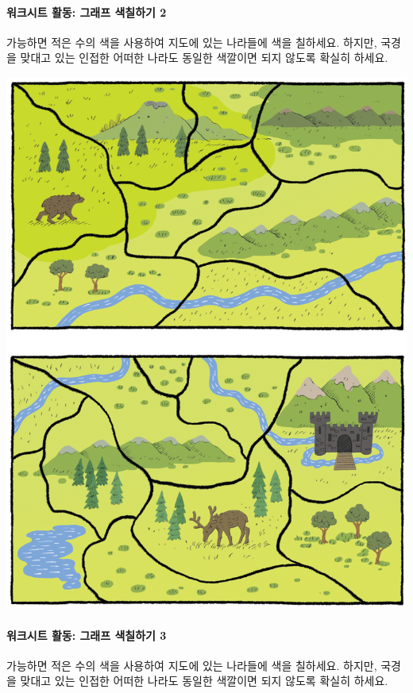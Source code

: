 \documentclass[]{article}
\begin{document}
\mbox{}\paragraph{워크시트 활동: 그래프 색칠하기 2}\label{section-191}

가능하면 적은 수의 색을 사용하여 지도에 있는 나라들에 색을 칠하세요.
하지만, 국경을 맞대고 있는 인접한 어떠한 나라도 동일한 색깔이면 되지
않도록 확실히 하세요.

\includegraphics{csunplugged/04-part/img/ch14-coloring/13-coloring-04-coloring-countries.png}

\mbox{}\paragraph{워크시트 활동: 그래프 색칠하기 3}\label{section-192}

가능하면 적은 수의 색을 사용하여 지도에 있는 나라들에 색을 칠하세요.
하지만, 국경을 맞대고 있는 인접한 어떠한 나라도 동일한 색깔이면 되지
않도록 확실히 하세요.
\end{document}
